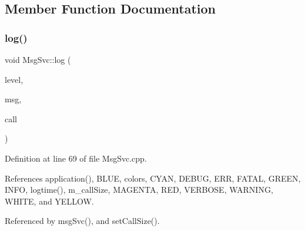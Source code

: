 \subsection{Member Function Documentation}
\mbox{\label{classMsgSvc_ad16d082e1bed97d14344d4942664d370}} 
\subsubsection{\texorpdfstring{log()}{log()}}
{\footnotesize\ttfamily void Msg\+Svc\+::log (\begin{DoxyParamCaption}\item[{\hyperlink{classMsgSvc_ae671eb7301996cd049d2da8a65925926}{Msg\+Svc\+::\+Msg\+Level}}]{level,  }\item[{std\+::string}]{msg,  }\item[{std\+::string}]{call }\end{DoxyParamCaption})\hspace{0.3cm}{\ttfamily [protected]}}



Definition at line 69 of file Msg\+Svc.\+cpp.



References application(), B\+L\+UE, colors, C\+Y\+AN, D\+E\+B\+UG, E\+RR, F\+A\+T\+AL, G\+R\+E\+EN, I\+N\+FO, logtime(), m\+\_\+call\+Size, M\+A\+G\+E\+N\+TA, R\+ED, V\+E\+R\+B\+O\+SE, W\+A\+R\+N\+I\+NG, W\+H\+I\+TE, and Y\+E\+L\+L\+OW.



Referenced by msg\+Svc(), and set\+Call\+Size().


